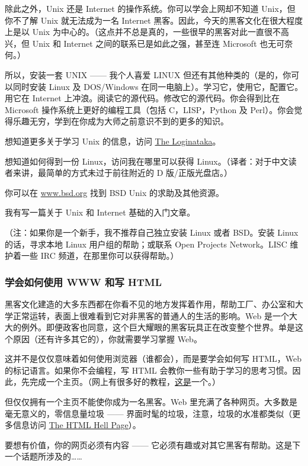 除此之外，Unix 还是 Internet 的操作系统。你可以学会上网却不知道 Unix，但你不了解 Unix 就无法成为一名 Internet 黑客。因此，今天的黑客文化在很大程度上是以 Unix 为中心的。（这点并不总是真的，一些很早的黑客对此一直很不高兴，但 Unix 和 Internet 之间的联系已是如此之强，甚至连 Microsoft 也无可奈何。）

所以，安装一套 UNIX —— 我个人喜爱 LINUX 但还有其他种类的（是的，你可以同时安装 Linux 及 DOS/Windows 在同一电脑上）。学习它，使用它，配置它。用它在 Internet 上冲浪。阅读它的源代码。修改它的源代码。你会得到比在 Microsoft 操作系统上更好的编程工具（包括 C，LISP，Python 及 Perl）。你会觉得乐趣无穷，学到在你成为大师之前意识不到的更多的知识。

想知道更多关于学习 Unix 的信息，访问 \href{http://www.catb.org/esr/faqs/loginataka.html}{The Loginataka}。

想知道如何得到一份 Linux，访问我在哪里可以获得 Linux。（译者：对于中文读者来讲，最简单的方式未过于前往附近的 D 版/正版光盘店。）

你可以在 \url{www.bsd.org} 找到 BSD Unix 的求助及其他资源。

我有写一篇关于 Unix 和 Internet 基础的入门文章。

（注：如果你是一个新手，我不推荐自己独立安装 Linux 或者 BSD。安装 Linux 的话，寻求本地 Linux 用户组的帮助；或联系 Open Projects Network。LISC 维护着一些 IRC 频道，在那里你可以获得帮助。）


\subsubsection{学会如何使用 WWW 和写 HTML}
黑客文化建造的大多东西都在你看不见的地方发挥着作用，帮助工厂、办公室和大学正常运转，表面上很难看到它对非黑客的普通人的生活的影响。Web 是一个大大的例外。即便政客也同意，这个巨大耀眼的黑客玩具正在改变整个世界。单是这个原因（还有许多其它的），你就需要学习掌握 Web。

这并不是仅仅意味着如何使用浏览器（谁都会），而是要学会如何写 HTML，Web 的标记语言。如果你不会编程，写 HTML 会教你一些有助于学习的思考习惯。因此，先完成一个主页。（网上有很多好的教程，\href{http://htmldog.com/}{这是}一个。）

但仅仅拥有一个主页不能使你成为一名黑客。Web 里充满了各种网页。大多数是毫无意义的，零信息量垃圾 —— 界面时髦的垃圾，注意，垃圾的水准都类似（更多信息访问 \href{http://catb.org/~esr/html-hell.html}{The HTML Hell Page}）。

要想有价值，你的网页必须有内容 —— 它必须有趣或对其它黑客有帮助。这是下一个话题所涉及的……


